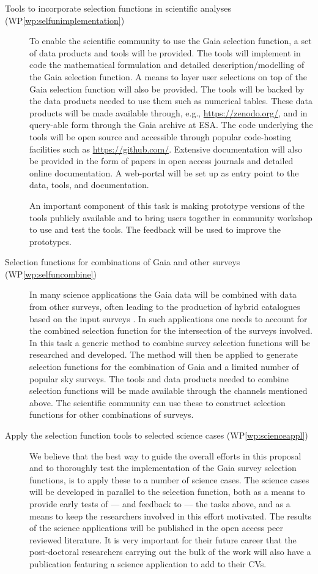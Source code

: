 \begin{description}
    \item[Tools to incorporate selection functions in scientific analyses (WP\ref{wp:selfunimplementation})] To enable the scientific community to use the Gaia selection function, a set of data products and tools will be provided. The tools will implement in code the mathematical formulation and detailed description/modelling of the Gaia selection function. A means to layer user selections on top of the Gaia selection function will also be provided. The tools will be backed by the data products needed to use them such as numerical tables. These data products will be made available through, e.g., \url{https://zenodo.org/}, and in query-able form through the Gaia archive at ESA. The code underlying the tools will be open source and accessible through popular code-hosting facilities such as \url{https://github.com/}. Extensive documentation will also be provided in the form of papers in open access journals and detailed online documentation. A web-portal will be set up as entry point to the data, tools, and documentation.
    
    An important component of this task is making prototype versions of the tools publicly available and to bring users together in community workshop to use and test the tools. The feedback will be used to improve the prototypes.
    \item[Selection functions for combinations of Gaia and other surveys (WP\ref{wp:selfuncombine})] In many science applications the Gaia data will be combined with data from other surveys, often leading to the production of hybrid catalogues based on the input surveys \citep[e.g.,][]{2019A&A...628A..94A}. In such applications one needs to account for the combined selection function for the intersection of the surveys involved. In this task a generic method to combine survey selection functions will be researched and developed. The method will then be applied to generate selection functions for the combination of Gaia and a limited number of popular sky surveys. The tools and data products needed to combine selection functions will be made available through the channels mentioned above. The scientific community can use these to construct selection functions for other combinations of surveys.
    \item[Apply the selection function tools to selected science cases (WP\ref{wp:scienceappl})] We believe that the best way to guide the overall efforts in this proposal and to thoroughly test the implementation of the Gaia survey selection functions, is to apply these to a number of science cases. The science cases will be developed in parallel to the selection function, both as a means to provide early tests of --- and feedback to --- the tasks above, and as a means to keep the researchers involved in this effort motivated. The results of the science applications will be published in the open access peer reviewed literature. It is very important for their future career that the post-doctoral researchers carrying out the bulk of the work will also have a publication featuring a science application to add to their CVs.
\end{description}

